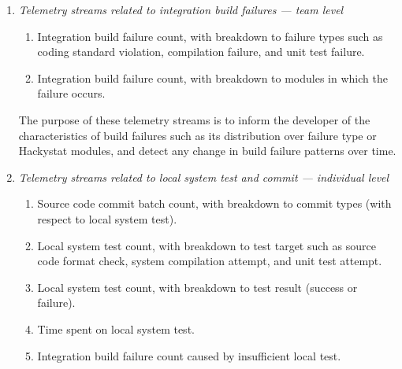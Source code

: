 \begin{enumerate}
	\item \textit{Telemetry streams related to integration build failures --- team level}
	
  \begin{enumerate}
	  \item Integration build failure count, with breakdown to failure types such as 
	        coding standard violation, compilation failure, and unit test failure.
	  \item Integration build failure count, with breakdown to modules in which the 
	        failure occurs.
  \end{enumerate}
	
The purpose of these telemetry streams is to inform the developer of the characteristics of build failures such as its distribution over failure type or Hackystat modules, and detect any change in build failure patterns over time.


	
		
	\item \textit{Telemetry streams related to local system test and commit --- individual level}
	
  \begin{enumerate}
	  \item Source code commit batch count, with breakdown to commit types (with respect to local system test).
	  \item Local system test count, with breakdown to test target such as source code format check, system compilation attempt, and unit test attempt.
	  \item Local system test count, with breakdown to test result (success or failure).
	  \item Time spent on local system test.
	  \item Integration build failure count caused by insufficient local test.
  \end{enumerate}
	

\end{enumerate}
